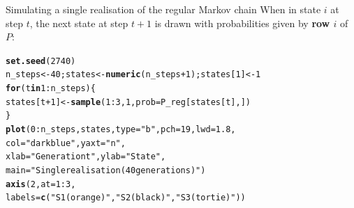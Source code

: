 \documentclass[aspectratio=169]{beamer}\usepackage[]{graphicx}\usepackage[]{xcolor}
\makeatletter
\newcommand{\hlnum}[1]{\textcolor[rgb]{0.686,0.059,0.569}{#1}}%
\newcommand{\hlsng}[1]{\textcolor[rgb]{0.192,0.494,0.8}{#1}}%
\newcommand{\hlopt}[1]{\textcolor[rgb]{0,0,0}{#1}}%
\newcommand{\hldef}[1]{\textcolor[rgb]{0.345,0.345,0.345}{#1}}%
\newcommand{\hlkwa}[1]{\textcolor[rgb]{0.161,0.373,0.58}{\textbf{#1}}}%
\newcommand{\hlkwb}[1]{\textcolor[rgb]{0.69,0.353,0.396}{#1}}%
\newcommand{\hlkwc}[1]{\textcolor[rgb]{0.333,0.667,0.333}{#1}}%
\newcommand{\hlkwd}[1]{\textcolor[rgb]{0.737,0.353,0.396}{\textbf{#1}}}%
\newenvironment{kframe}{%
 \def\at@end@of@kframe{}%
 \ifinner\ifhmode%
  \def\at@end@of@kframe{\end{minipage}}%
  \begin{minipage}{\columnwidth}%
 \fi\fi%
 \def\FrameCommand##1{\hskip\@totalleftmargin \hskip-\fboxsep
 \colorbox{shadecolor}{##1}\hskip-\fboxsep
     \hskip-\linewidth \hskip-\@totalleftmargin \hskip\columnwidth}%
 \MakeFramed {\advance\hsize-\width
   \@totalleftmargin\z@ \linewidth\hsize
   \@setminipage}}%
 {\par\unskip\endMakeFramed%
 \at@end@of@kframe}
\newenvironment{knitrout}{}{} %
\makeatother
\begin{document}
\begin{frame}[fragile]{Simulating a single realisation of the regular Markov chain}
When in state $i$ at step $t$, the next state at step $t+1$ is drawn with probabilities given by \textbf{row $i$} of $P$:
\begin{knitrout}
\color{fgcolor}\begin{kframe}
\begin{alltt}
\hlkwd{set.seed}\hldef{(}\hlnum{2740}\hldef{)}
\hldef{n_steps} \hlkwb{<-} \hlnum{40}\hldef{; states} \hlkwb{<-} \hlkwd{numeric}\hldef{(n_steps} \hlopt{+} \hlnum{1}\hldef{); states[}\hlnum{1}\hldef{]} \hlkwb{<-} \hlnum{1}
\hlkwa{for} \hldef{(t} \hlkwa{in} \hlnum{1}\hlopt{:}\hldef{n_steps) \{}
  \hldef{states[t} \hlopt{+} \hlnum{1}\hldef{]} \hlkwb{<-} \hlkwd{sample}\hldef{(}\hlnum{1}\hlopt{:}\hlnum{3}\hldef{,} \hlnum{1}\hldef{,} \hlkwc{prob} \hldef{= P_reg[states[t], ])}
\hldef{\}}
\hlkwd{plot}\hldef{(}\hlnum{0}\hlopt{:}\hldef{n_steps, states,} \hlkwc{type} \hldef{=} \hlsng{"b"}\hldef{,} \hlkwc{pch} \hldef{=} \hlnum{19}\hldef{,} \hlkwc{lwd} \hldef{=} \hlnum{1.8}\hldef{,}
     \hlkwc{col} \hldef{=} \hlsng{"darkblue"}\hldef{,} \hlkwc{yaxt} \hldef{=} \hlsng{"n"}\hldef{,}
     \hlkwc{xlab} \hldef{=} \hlsng{"Generation t"}\hldef{,} \hlkwc{ylab} \hldef{=} \hlsng{"State"}\hldef{,}
     \hlkwc{main} \hldef{=} \hlsng{"Single realisation (40 generations)"}\hldef{)}
\hlkwd{axis}\hldef{(}\hlnum{2}\hldef{,} \hlkwc{at} \hldef{=} \hlnum{1}\hlopt{:}\hlnum{3}\hldef{,}
     \hlkwc{labels} \hldef{=} \hlkwd{c}\hldef{(}\hlsng{"S1 (orange)"}\hldef{,} \hlsng{"S2 (black)"}\hldef{,} \hlsng{"S3 (tortie)"}\hldef{))}
\end{alltt}
\end{kframe}
\end{knitrout}
\end{frame}

\end{document}
